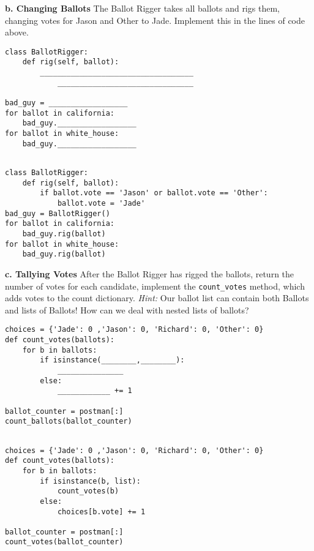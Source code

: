 \begin{blocksection}
\vspace{1\baselineskip}
\textbf{b. Changing Ballots}
The Ballot Rigger takes all ballots and rigs them, changing votes for Jason and Other to Jade. Implement this in the lines of code above.
\vspace{1\baselineskip}
\begin{lstlisting}
class BallotRigger:
    def rig(self, ballot):
        ___________________________________
        	_______________________________

bad_guy = __________________
for ballot in california:
    bad_guy.__________________
for ballot in white_house:
    bad_guy.__________________


\end{lstlisting}
\begin{solution}[1in]
\begin{lstlisting}
class BallotRigger:
    def rig(self, ballot):
        if ballot.vote == 'Jason' or ballot.vote == 'Other':
            ballot.vote = 'Jade'
bad_guy = BallotRigger()
for ballot in california:
    bad_guy.rig(ballot)
for ballot in white_house:
    bad_guy.rig(ballot)
\end{lstlisting}
\end{solution}
\end{blocksection}

\begin{blocksection}
\vspace{1\baselineskip}
\textbf{c. Tallying Votes}
After the Ballot Rigger has rigged the ballots, return the number of votes for each candidate, implement the \lstinline{count_votes} method, which adds votes to the count dictionary. 
\emph{Hint:} Our ballot list can contain both Ballots and lists of Ballots! How can we deal with nested lists of ballots?
\vspace{1\baselineskip}
\begin{lstlisting}
choices = {'Jade': 0 ,'Jason': 0, 'Richard': 0, 'Other': 0}
def count_votes(ballots):
    for b in ballots:
        if isinstance(________,________):
            _______________
        else:
            ____________ += 1

ballot_counter = postman[:]
count_ballots(ballot_counter)


\end{lstlisting}
\begin{solution}[1in]
\begin{lstlisting}
choices = {'Jade': 0 ,'Jason': 0, 'Richard': 0, 'Other': 0}
def count_votes(ballots):
    for b in ballots:
        if isinstance(b, list):
            count_votes(b)
        else:
            choices[b.vote] += 1

ballot_counter = postman[:]
count_votes(ballot_counter)
\end{lstlisting}
\end{solution}
\end{blocksection}



